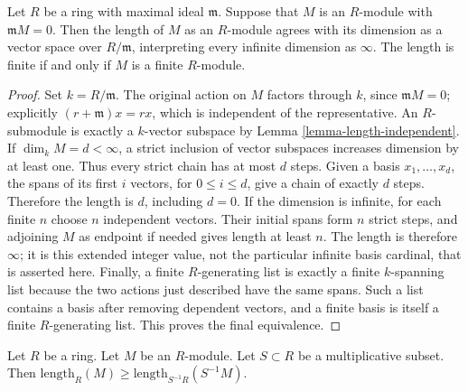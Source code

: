 \begin{lemma}
\label{lemma-dimension-is-length}
Let $R$ be a ring with maximal ideal $\mathfrak m$.
Suppose that $M$ is an $R$-module with
$\mathfrak m M  =  0$. Then the length of $M$ as
an $R$-module agrees with its dimension as a vector space over
$R/\mathfrak m$, interpreting every infinite dimension as $\infty$.
The length is finite if and only if $M$ is a finite $R$-module.
\end{lemma}

\begin{proof}
Set $k=R/\mathfrak m$. The original action on $M$ factors
through $k$, since $\mathfrak mM=0$; explicitly
$(r+\mathfrak m)x=rx$, which is independent of the representative.
An $R$-submodule is exactly a $k$-vector subspace by
Lemma \ref{lemma-length-independent}.
If $\dim_k M=d<\infty$, a strict inclusion of vector subspaces
increases dimension by at least one. Thus every strict chain has
at most $d$ steps. Given a basis $x_1,\ldots,x_d$, the spans
of its first $i$ vectors, for $0\leq i\leq d$, give a chain
of exactly $d$ steps. Therefore the length is $d$, including $d=0$.
If the dimension is infinite, for each finite $n$ choose
$n$ independent vectors. Their initial spans form $n$ strict
steps, and adjoining $M$ as endpoint if needed gives length at
least $n$. The length is therefore $\infty$; it is this extended
integer value, not the particular infinite basis cardinal, that
is asserted here.
Finally, a finite $R$-generating list is exactly a finite
$k$-spanning list because the two actions just described have the
same spans. Such a list contains a basis after removing dependent
vectors, and a finite basis is itself a finite $R$-generating
list. This proves the final equivalence.
\end{proof}

\begin{lemma}
\label{lemma-length-localize}
Let $R$ be a ring. Let $M$ be an $R$-module. Let $S \subset R$ be
a multiplicative subset. Then
$\text{length}_R(M) \geq \text{length}_{S^{-1}R}(S^{-1}M)$.
\end{lemma}

